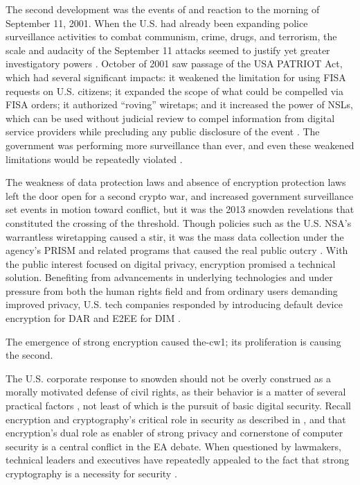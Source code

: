 
The second development was the events of and reaction to the morning of September 11, 2001. When the U.S. had already
been expanding police surveillance activities to combat communism, crime, drugs, and terrorism, the scale and audacity
of the September 11 attacks seemed to justify yet greater investigatory powers \cite{bloss_escalating_2007}. October of
2001 saw passage of the USA PATRIOT Act, which had several significant impacts: it weakened the limitation for using
\ac{FISA} requests on U.S. citizens; it expanded the scope of what could be compelled via \ac{FISA} orders; it
authorized ``roving'' wiretaps; and it increased the power of \acp{NSL}, which can be used without judicial review to
compel information from digital service providers while precluding any public disclosure of the event
\cite{sensenbrenner_2001} \cite{shamsi_2011}. The government was performing more surveillance than ever, and even these
weakened limitations would be repeatedly violated \cite{shamsi_2011} \cite{tucker_2020}.

The weakness of data protection laws and absence of encryption protection laws left the door open for a second crypto
war, and increased government surveillance set events in motion toward conflict, but it was the 2013 \ac{snowden}
revelations that constituted the crossing of the threshold. Though policies such as the U.S. \ac{NSA}'s warrantless
wiretapping caused a stir, it was the mass data collection under the agency's \ac{PRISM} and related programs that
caused the real public outcry \cite{landau_making_2013}. With the public interest focused on digital privacy, encryption
promised a technical solution. Benefiting from advancements in underlying technologies and under pressure from both the
human rights field and from ordinary users demanding improved privacy, U.S. tech companies responded by introducing
default device encryption for \acl{DAR} and \acl{E2EE} for \acl{DIM} \cite{treguer_us_2018}.

The emergence of strong encryption caused \ac{the-cw1}; its proliferation is causing the second.

The U.S. corporate response to \ac{snowden} should not be overly construed as a morally motivated defense of civil
rights, as their behavior is a matter of several practical factors \cite{treguer_us_2018}, not least of which is the
pursuit of basic digital security. Recall encryption and cryptography's critical role in security as described in
, and that encryption's dual role as enabler of strong privacy and cornerstone of computer
security is a central conflict in the \ac{EA} debate. When questioned by lawmakers, technical leaders and executives
have repeatedly appealed to the fact that strong cryptography is a necessity for security \cite{schulze_clipper_2017}.


